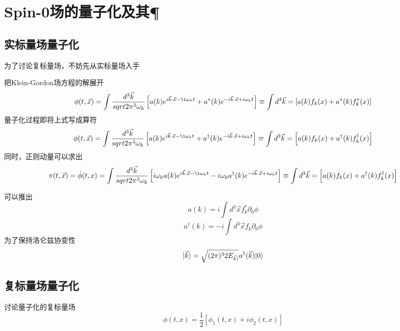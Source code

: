 \section{Spin-0场的量子化及其\C \P \T}
\subsection{实标量场量子化}
为了讨论复标量场，不妨先从实标量场入手

把Klein-Gordon场方程的解展开
\begin{equation}
    \phi(t, \vec x) = \int \VolumeUnit k \omega \left[ a(k) e^{i\vec k \cdot \vec x - \i\omega_k t} + a^*(k)e^{-i\vec k \cdot \vec x + i \omega_k t} \right]
    \equiv \int d^3\vec k = \left[a(k)f_k(x) + a^*(k)f_k^*(x)\right]
\end{equation}
量子化过程即将上式写成算符
\begin{equation}
    \phi(t, \vec x) = \int \VolumeUnit k \omega \left[ a(k) e^{i\vec k \cdot \vec x - \i\omega_k t} + a^\dagger(k)e^{-i\vec k \cdot \vec x + i \omega_k t} \right]
    \equiv \int d^3\vec k = \left[a(k)f_k(x) + a^\dagger(k)f_k^\dagger(x)\right]
\end{equation}
同时，正则动量可以求出
\begin{equation}
    \pi(t, \vec x) = \dot \phi(t, x) = \int \VolumeUnit k \omega \left[ i\omega_k a(k) e^{i\vec k \cdot \vec x - \i\omega_k t} - i\omega_k a^\dagger(k)e^{-i\vec k \cdot \vec x + i \omega_k t} \right]
    \equiv \int d^3\vec k = \left[a(k)f_k(x) + a^\dagger(k)f_k^\dagger(x)\right]
\end{equation}

可以推出
\begin{equation}
    a(k) = i \int d^3 \vec x f_k^*\partial_0\phi
\end{equation}
\begin{equation}
    a^\dagger(k) = -i \int d^3 \vec x f_k\partial_0\phi
\end{equation}
为了保持洛仑兹协变性
\begin{equation}
|\vec k\rangle = \sqrt{(2\pi)^32E_{\vec k)}} a^\dagger(\vec k)|0\rangle
\end{equation}

\subsection{复标量场量子化}
讨论量子化的复标量场
\begin{equation}
    \phi(t, x) = \frac 1  2 [\phi_1(t, x) + i\phi_2(t, x)]
\end{equation}

